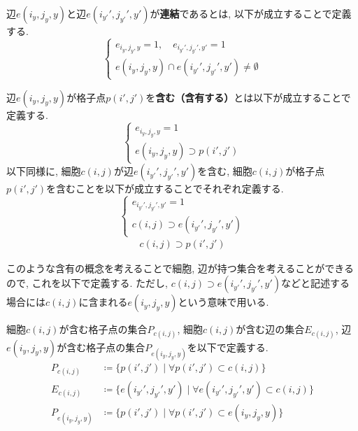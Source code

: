\begin{definition}[連結]\label{definition:Connection}
  辺$e(i_y,j_y,y)$と辺$e(i_{y'}',j_{y'}',y')$が\textbf{連結}であるとは, 以下が成立することで定義する.
  \begin{equation*}
    \begin{cases}
      {e_{i_y,j_y,y}=1,\quad e_{i_{y'}',j_{y'}',y'}  =     1          } \\
      {e(i_y,j_y,y)\cap e(i_{y'}',j_{y'}',y')  \neq  \emptyset}
    \end{cases}
  \end{equation*}
\end{definition}

\begin{definition}[含有]\label{definition:Contain}
  辺$e(i_y,j_y,y)$が格子点$p(i',j')$を\textbf{含む（含有する）}とは以下が成立することで定義する.
  \begin{equation*}
    \begin{cases}
      {e_{i_y,j_y,y}=1               } \\
      {e(i_y,j_y,y)\supset p(i',j')}
    \end{cases}
  \end{equation*}
  以下同様に, 細胞$c(i,j)$が辺$e(i_{y'}',j_{y'}',y')$を含む, 細胞$c(i,j)$が格子点$p(i',j')$を含むことを以下が成立することでそれぞれ定義する.
  \begin{equation*}
    \begin{cases}
      {e_{i_{y'}',j_{y'}',y'}=1 } \\
      {c(i,j)\supset e(i_{y'}',j_{y'}',y')}
    \end{cases}
  \end{equation*}
  \begin{align*}
    c(i,j)\supset p(i',j')
  \end{align*}
\end{definition}
このような含有の概念を考えることで細胞, 辺が持つ集合を考えることができるので, これを以下で定義する. ただし, $c(i,j)\supset e(i_{y'}',j_{y'}',y')$などと記述する場合には$c(i,j)$に含まれる$e(i_y,j_y,y)$という意味で用いる.
\begin{definition}[$P_{c(i,j)}$, $E_{c(i,j)}$, $P_{e(i_y,j_y,y)}$]
  細胞$c(i,j)$が含む格子点の集合$P_{c(i,j)}$, 細胞$c(i,j)$が含む辺の集合$E_{c(i,j)}$, 辺$e(i_y,j_y,y)$が含む格子点の集合$P_{e(i_y,j_y,y)}$を以下で定義する.
  \begin{align*}
    P_{c(i,j)}       & \coloneqq \{p(i',j') \mid \forall p(i',j') \subset c(i,j)\}                           \\
    E_{c(i,j)}       & \coloneqq \{e(i_{y'}',j_{y'}',y') \mid \forall e(i_{y'}',j_{y'}',y') \subset c(i,j)\} \\
    P_{e(i_y,j_y,y)} & \coloneqq \{p(i',j') \mid \forall p(i',j') \subset e(i_y,j_y,y)\}
  \end{align*}
\end{definition}


